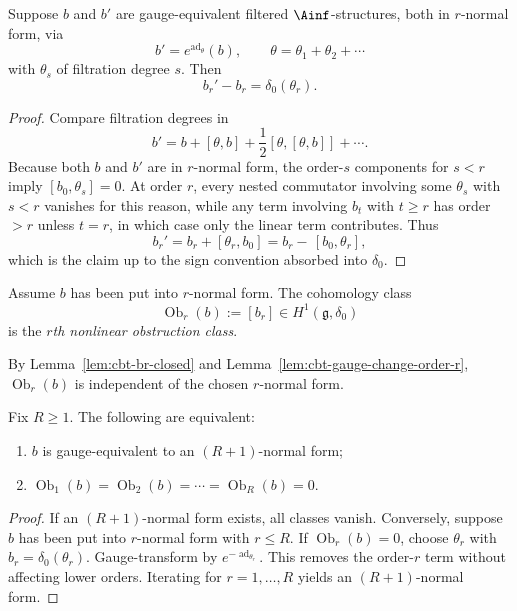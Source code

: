 \begin{lemma}
\label{lem:cbt-gauge-change-order-r}
\ClaimStatusProvedHere
Suppose $b$ and $b'$ are gauge-equivalent filtered $\Ainf$-structures, both in $r$-normal form, via
\[
b'=e^{\operatorname{ad}_\theta}(b),
\qquad
\theta=\theta_1+\theta_2+\cdots
\]
with $\theta_s$ of filtration degree $s$. Then
\[
b_r'-b_r=\delta_0(\theta_r).
\]
\end{lemma}

\begin{proof}
Compare filtration degrees in
\[
b'=b+[\theta,b]+\frac12[\theta,[\theta,b]]+\cdots.
\]
Because both $b$ and $b'$ are in $r$-normal form, the order-$s$ components for $s<r$ imply $[b_0,\theta_s]=0$. At order $r$, every nested commutator involving some $\theta_s$ with $s<r$ vanishes for this reason, while any term involving $b_t$ with $t\ge r$ has order $>r$ unless $t=r$, in which case only the linear term contributes. Thus
\[
b_r'=b_r+[\theta_r,b_0]=b_r-\,[b_0,\theta_r],
\]
which is the claim up to the sign convention absorbed into $\delta_0$.
\end{proof}

\begin{definition}
\label{def:cbt-obstruction-classes}
Assume $b$ has been put into $r$-normal form. The cohomology class
\[
\operatorname{Ob}_r(b):=[b_r]\in H^1(\mathfrak g,\delta_0)
\]
is the \emph{$r$th nonlinear obstruction class}.
\end{definition}

By Lemma~\ref{lem:cbt-br-closed} and Lemma~\ref{lem:cbt-gauge-change-order-r}, $\operatorname{Ob}_r(b)$ is independent of the chosen $r$-normal form.

\begin{theorem}
\label{thm:cbt-recursive-linearization}
\ClaimStatusProvedHere
Fix $R\ge1$. The following are equivalent:
\begin{enumerate}[label=\textup{(\roman*)},leftmargin=2em]
\item $b$ is gauge-equivalent to an $(R+1)$-normal form;
\item $\operatorname{Ob}_1(b)=\operatorname{Ob}_2(b)=\cdots=\operatorname{Ob}_R(b)=0$.
\end{enumerate}
\end{theorem}

\begin{proof}
If an $(R+1)$-normal form exists, all classes vanish. Conversely, suppose $b$ has been put into $r$-normal form with $r\le R$. If $\operatorname{Ob}_r(b)=0$, choose $\theta_r$ with $b_r=\delta_0(\theta_r)$. Gauge-transform by $e^{-\operatorname{ad}_{\theta_r}}$. This removes the order-$r$ term without affecting lower orders. Iterating for $r=1,\dots,R$ yields an $(R+1)$-normal form.
\end{proof}

